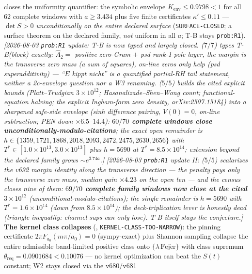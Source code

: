  closes the uniformity quantifier:
the symbolic envelope $K_{\mathrm{env}}\le0.9798<1$ for all $62$
complete windows with $a\ge3.434$ plus five finite certificates
$\kappa'\le0.11$ --- $\det S>0$ \emph{unconditionally on the entire
declared surface} (\texttt{SURFACE-CLOSED}; a surface theorem on the
declared family, \emph{not} uniform in all $a$; T-B stays
\texttt{prob:R1}).  \emph{[2026-08-03 \texttt{prob:R1} update: T-B is
now typed and largely closed.  
($7/7$) types T-B(block) exactly: $\hat A_2=$ positive zero-Gram $+$
psd rank-1 pole layer, the margin \emph{is} the transverse zero mass
(a sum of squares), on-line zeros only help (psd superadditivity) ---
``$E$ kippt nicht'' is a \emph{quantified partial-RH tail} statement,
neither a 2c-envelope question nor a W3 renaming.
 ($5/5$) builds the cited
explicit bounds (Platt--Trudgian $3\times10^{12}$;
Hasanalizade--Shen--Wong count; functional-equation halving; the
explicit Ingham-form zero density, arXiv:2507.15184) into a sharpened
safe-side envelope (sinh difference pairing, $V(0)=0$, on-line
subtraction; PEN down $\times6.5$--$14.4$): \textbf{$60/70$ complete
windows close unconditionally-modulo-citations}; the exact open
remainder is $h\in\{1359,1721,1868,2018,2093,2472,2475,2630,2656\}$
with $T^*\in[1.0\times10^{13},3.0\times10^{13}]$ plus $h=5690$ at
$T^*=8.5\times10^{14}$; extension beyond the declared family grows
$\sim e^{3.74a}$.]}  \emph{[2026-08-03 \texttt{prob:R1} update II:
 ($5/5$) scalarizes the v692
margin identity along the transverse direction --- the penalty pays
only the transverse zero mass, median gain $\times4.23$ on the open
ten --- and the census closes nine of them: \textbf{$69/70$ complete
family windows now close at the cited $3\times10^{12}$}
(unconditional-modulo-citations); the single remainder is $h=5690$
with $T^*=1.6\times10^{14}$ (down from $8.5\times10^{14}$); the
deck-triplication lever is honestly dead (triangle inequality:
channel sups can only lose).  T-B itself stays the conjecture.]}  \textbf{The kernel class collapses}
(, \texttt{KERNEL-CLASS-TOO-NARROW}):
the pinning certificate $2\pi F_{a_0}(m\pi/a_0)=0$ (sympy-exact) plus
Shannon sampling collapse the entire admissible band-limited positive
class onto $\{\lambda\,\mathrm{Fej\acute er}\}$ with class supremum
$\theta_{\mathrm{req}}=0.0901684<0.10076$ --- no kernel optimization
can beat the $S(t)$ constant; W2 stays closed via the v680/v681
